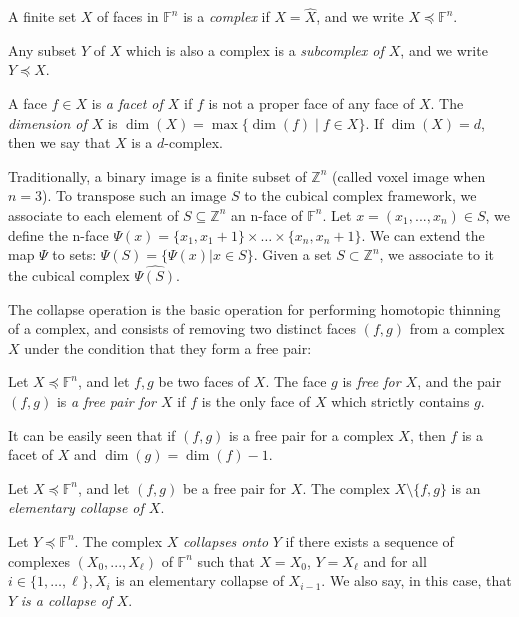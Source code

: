 \documentclass[final,envcountsame]{llncs}
\def\myem#1{{\em #1}}
\def\V2C{\Psi}
\def\Zset{\Z}
\def\Z{\mathbb{Z}}
\def\allfaces#1{\mathbb{F}^{#1}}
\def\subcomplex#1#2{#1 \preceq #2}
\def\complex#1#2{\subcomplex{#2}{\allfaces{#1}}}
\def\closure#1{\widehat{#1}}
\def\mydim#1{\dim(#1)}
\def\suchthat{\;|\;}
\def\dinterval#1#2{\{#1,\ldots,#2\}}
\begin{document}
\begin{definition}
A finite set $X$ of faces in $\allfaces{n}$ is a \myem{complex} if $X=\closure{X}$, and we write $\complex{n}{X}$. 

Any subset $Y$ of $X$ which is also a complex is a \myem{subcomplex of $X$}, and we write $\subcomplex{Y}{X}$.
\end{definition}



A face $f \in X$ is \myem{a facet of $X$} if $f$ is not a proper face of any face of $X$. The \myem{dimension of $X$} is $\mydim{X} = \max\{\mydim{f} \suchthat f \in X\}$. If $\mydim{X} = d$, then we say that $X$ is a $d$-complex.

Traditionally, a binary image is a finite subset of $\Zset^n$ (called voxel image when $n=3$). To transpose such an image $S$ to the cubical complex framework, we associate to each element of $S\subseteq \Zset^n$ an n-face of $\allfaces{n}$. Let $x=(x_1,...,x_n) \in S$, we define the n-face $\V2C(x) = \{x_1, x_1 + 1\} \times \ldots \times \{x_n, x_n + 1\}$. We can extend the map $\V2C$ to sets: $\V2C(S)=\{\V2C(x) | x \in S\}$. Given a set $S \subset \Zset^n$, we associate to it the cubical complex $\closure{\V2C(S)}$.

The collapse operation is the basic operation for performing homotopic thinning of a complex, and consists of removing two distinct faces $(f,g)$ from a complex $X$ under the condition that they form a free pair:

\begin{definition}
Let $\complex{n}{X}$, and let $f,g$ be two faces of $X$. The face $g$ is \myem{free for $X$}, and the pair $(f,g)$ is \myem{a free pair for $X$} if $f$ is the only face of $X$ which strictly contains $g$. 
\end{definition}

It can be easily seen that if $(f,g)$ is a free pair for a complex $X$, then $f$ is a facet of $X$ and $\dim(g) = \dim(f)-1$.

\begin{definition}
Let $\complex{n}{X}$, and let $(f,g)$ be a free pair for $X$. The complex $X \setminus \{f,g\}$ is an \myem{elementary collapse of $X$}.

Let $\complex{n}{Y}$. The complex $X$ \myem{collapses onto} $Y$ if there exists a sequence of complexes $(X_0,...,X_\ell)$ of $\allfaces{n}$ such that $X=X_0$, $Y=X_\ell$ and for all $i \in \dinterval{1}{\ell}, X_{i}$ is an elementary collapse of $X_{i-1}$. We also say, in this case, that $Y$ \myem{is a collapse of} $X$.
\end{definition}
\end{document}
